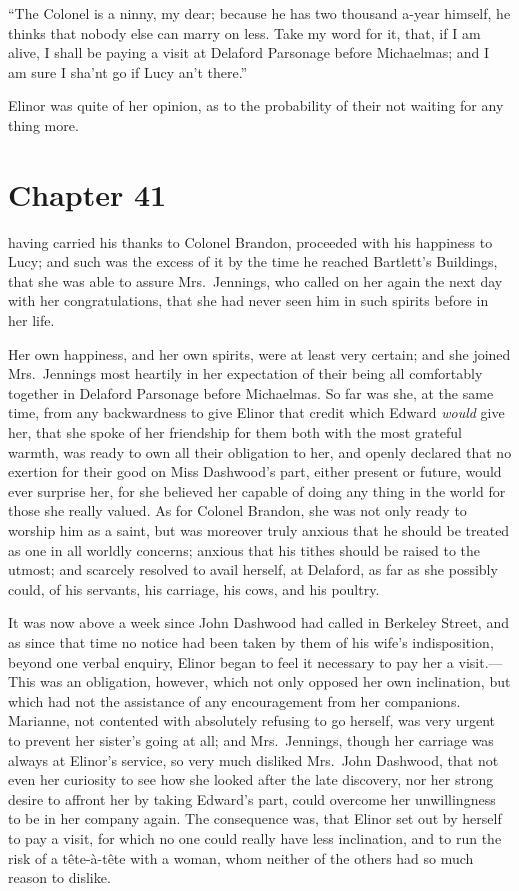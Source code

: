 ``The Colonel is a ninny, my dear; because he has two
thousand a-year himself, he thinks that nobody else can marry
on less.  Take my word for it, that, if I am alive, I shall
be paying a visit at Delaford Parsonage before Michaelmas;
and I am sure I sha'nt go if Lucy an't there.''

Elinor was quite of her opinion, as to the probability
of their not waiting for any thing more.



\chapter{Chapter 41}


 having carried his thanks to Colonel Brandon,
proceeded with his happiness to Lucy; and such was the
excess of it by the time he reached Bartlett's Buildings,
that she was able to assure Mrs.\ Jennings, who called
on her again the next day with her congratulations,
that she had never seen him in such spirits before
in her life.

Her own happiness, and her own spirits, were at
least very certain; and she joined Mrs.\ Jennings most
heartily in her expectation of their being all comfortably
together in Delaford Parsonage before Michaelmas.
So far was she, at the same time, from any backwardness
to give Elinor that credit which Edward \emph{would} give her,
that she spoke of her friendship for them both with the most
grateful warmth, was ready to own all their obligation
to her, and openly declared that no exertion for their
good on Miss Dashwood's part, either present or future,
would ever surprise her, for she believed her capable of
doing any thing in the world for those she really valued.
As for Colonel Brandon, she was not only ready to worship
him as a saint, but was moreover truly anxious that
he should be treated as one in all worldly concerns;
anxious that his tithes should be raised to the utmost;
and scarcely resolved to avail herself, at Delaford,
as far as she possibly could, of his servants, his carriage,
his cows, and his poultry.

It was now above a week since John Dashwood had
called in Berkeley Street, and as since that time no notice
had been taken by them of his wife's indisposition,
beyond one verbal enquiry, Elinor began to feel it
necessary to pay her a visit.---This was an obligation,
however, which not only opposed her own inclination,
but which had not the assistance of any encouragement
from her companions.  Marianne, not contented with
absolutely refusing to go herself, was very urgent
to prevent her sister's going at all; and Mrs.\ Jennings,
though her carriage was always at Elinor's service,
so very much disliked Mrs.\ John Dashwood, that not even her
curiosity to see how she looked after the late discovery,
nor her strong desire to affront her by taking Edward's part,
could overcome her unwillingness to be in her company again.
The consequence was, that Elinor set out by herself
to pay a visit, for which no one could really have
less inclination, and to run the risk of a t\^{e}te-\`{a}-t\^{e}te
with a woman, whom neither of the others had so much
reason to dislike.

